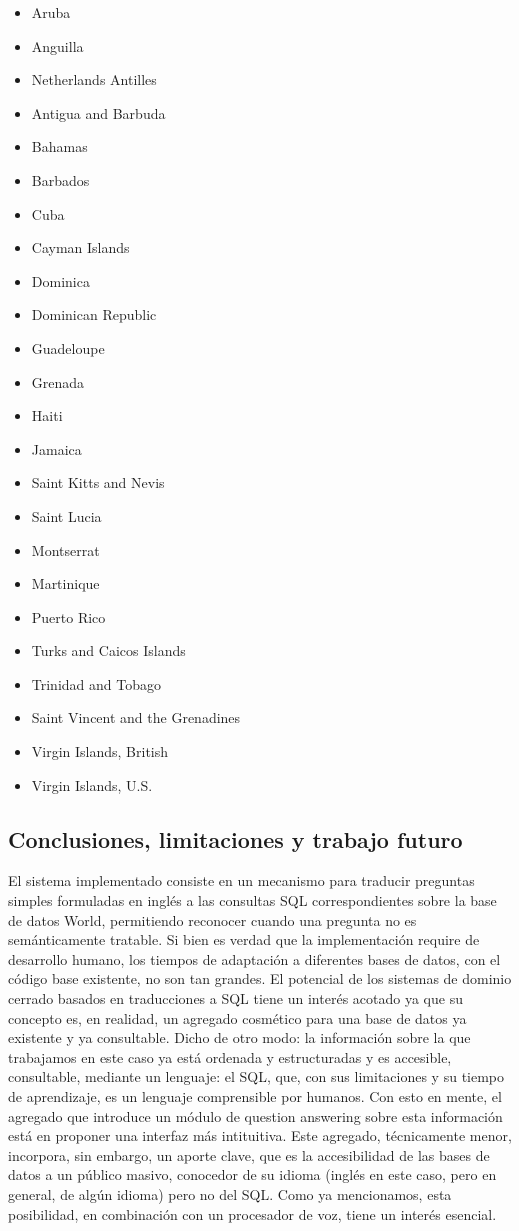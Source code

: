\begin{itemize}
 \item Aruba
 \item Anguilla
 \item Netherlands Antilles
 \item Antigua and Barbuda
 \item Bahamas
 \item Barbados
 \item Cuba
 \item Cayman Islands
 \item Dominica
 \item Dominican Republic
 \item Guadeloupe
 \item Grenada
 \item Haiti
 \item Jamaica
 \item Saint Kitts and Nevis
 \item Saint Lucia
 \item Montserrat
 \item Martinique
 \item Puerto Rico
 \item Turks and Caicos Islands
 \item Trinidad and Tobago
 \item Saint Vincent and the Grenadines
 \item Virgin Islands, British
 \item Virgin Islands, U.S.
\end{itemize}


\subsection{Conclusiones, limitaciones y trabajo futuro}
\label{subsec:popescu-cierre}

El sistema implementado consiste en un mecanismo para traducir preguntas simples formuladas en inglés a las consultas SQL correspondientes sobre la base de datos World, permitiendo reconocer cuando una pregunta no es semánticamente tratable. Si bien es verdad que la implementación require de desarrollo humano, los tiempos de adaptación a diferentes bases de datos, con el código base existente, no son tan grandes. El potencial de los sistemas de dominio cerrado basados en traducciones a SQL tiene un interés acotado ya que su concepto es, en realidad, un agregado cosmético para una base de datos ya existente y ya consultable. Dicho de otro modo: la información sobre la que trabajamos en este caso ya está ordenada y estructuradas y es accesible, consultable, mediante un lenguaje: el SQL, que, con sus limitaciones y su tiempo de aprendizaje, es un lenguaje comprensible por humanos. Con esto en mente, el agregado que introduce un módulo de question answering sobre esta información está en proponer una interfaz más intituitiva. Este agregado, técnicamente menor, incorpora, sin embargo, un aporte clave, que es la accesibilidad de las bases de datos a un público masivo, conocedor de su idioma (inglés en este caso, pero en general, de algún idioma) pero no del SQL. Como ya mencionamos, esta posibilidad, en combinación con un procesador de voz, tiene un interés esencial.

